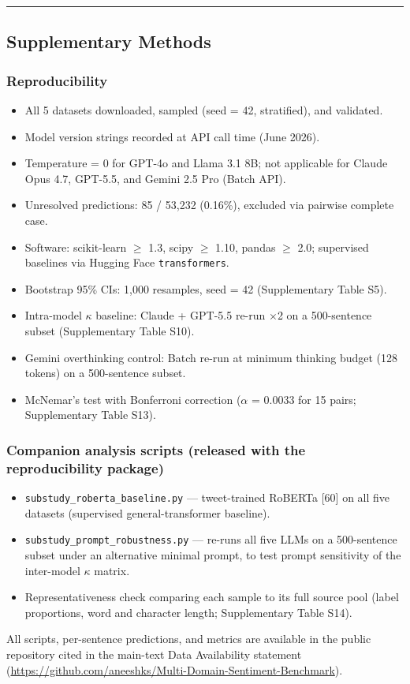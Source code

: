 \documentclass[11pt]{article}
\providecommand{\tightlist}{\setlength{\itemsep}{0pt}\setlength{\parskip}{0pt}}
\begin{document}
\begin{center}\rule{0.5\linewidth}{0.5pt}\end{center}

\subsection{Supplementary Methods}\label{supplementary-methods}

\subsubsection{Reproducibility}\label{reproducibility}

\begin{itemize}
\tightlist
\item
  All 5 datasets downloaded, sampled (seed = 42, stratified), and
  validated.
\item
  Model version strings recorded at API call time (June 2026).
\item
  Temperature = 0 for GPT-4o and Llama 3.1 8B; not applicable for Claude
  Opus 4.7, GPT-5.5, and Gemini 2.5 Pro (Batch API).
\item
  Unresolved predictions: 85 / 53,232 (0.16\%), excluded via pairwise
  complete case.
\item
  Software: scikit-learn $\geq$ 1.3, scipy $\geq$ 1.10, pandas $\geq$ 2.0; supervised
  baselines via Hugging Face \texttt{transformers}.
\item
  Bootstrap 95\% CIs: 1,000 resamples, seed = 42 (Supplementary Table
  S5).
\item
  Intra-model $\kappa$ baseline: Claude + GPT-5.5 re-run $\times$2 on a 500-sentence
  subset (Supplementary Table S10).
\item
  Gemini overthinking control: Batch re-run at minimum thinking budget
  (128 tokens) on a 500-sentence subset.
\item
  McNemar's test with Bonferroni correction ($\alpha$ = 0.0033 for 15 pairs;
  Supplementary Table S13).
\end{itemize}

\subsubsection{Companion analysis scripts (released with the
reproducibility
package)}\label{companion-analysis-scripts-released-with-the-reproducibility-package}

\begin{itemize}
\tightlist
\item
  \texttt{substudy\_\allowbreak{}roberta\_\allowbreak{}baseline.py} --- tweet-trained RoBERTa
  {[}60{]} on all five datasets (supervised general-transformer
  baseline).
\item
  \texttt{substudy\_\allowbreak{}prompt\_\allowbreak{}robustness.py} --- re-runs all five LLMs on
  a 500-sentence subset under an alternative minimal prompt, to test
  prompt sensitivity of the inter-model $\kappa$ matrix.
\item
  Representativeness check comparing each sample to its full source pool
  (label proportions, word and character length; Supplementary Table
  S14).
\end{itemize}

All scripts, per-sentence predictions, and metrics are available in the
public repository cited in the main-text Data Availability statement
(\url{https://github.com/aneeshks/Multi-Domain-Sentiment-Benchmark}).
\end{document}
